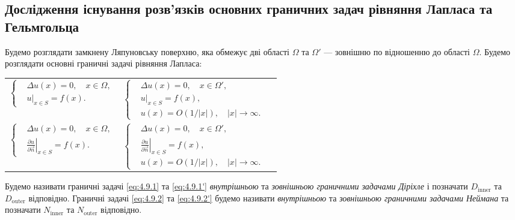\subsection{Дослідження існування розв'язків основних граничних задач рівняння Лапласа та Гельмгольца}

Будемо розглядати замкнену Ляпуновську поверхню, яка обмежує дві області $\Omega$ та $\Omega'$ --- зовнішню по відношенню до області $\Omega$. Будемо розглядати основні граничні задачі рівняння Лапласа:
\begin{longtable}{p{} p{} p{}}
	\parbox{.45\textwidth}{\begin{equation}\label{eq:4.9.1}\left\{\begin{aligned}
		& \Delta u(x) = 0, \quad x \in \Omega, \\
		& \left. u \right|_{x \in S} = f(x).
	\end{aligned}\right.\end{equation}} & \parbox{.45\textwidth}{\begin{equation}\label{eq:4.9.1'}\left\{\begin{aligned}
		& \Delta u(x) = 0, \quad x \in \Omega', \\
		& \left. u \right|_{x \in S} = f(x), \\
		& u(x) = O(1/|x|), \quad |x| \to \infty.
	\end{aligned}\right.\end{equation}} \\
	\parbox{.45\textwidth}{\begin{equation}\label{eq:4.9.2}\left\{\begin{aligned}
		& \Delta u(x) = 0, \quad x \in \Omega, \\
		& \left. \frac{\partial u}{\partial \vec n} \right|_{x \in S} = f(x).
	\end{aligned}\right.\end{equation}} & \parbox{.45\textwidth}{\begin{equation}\label{eq:4.9.2'}\left\{\begin{aligned}
		& \Delta u(x) = 0, \quad x \in \Omega', \\
		& \left. \frac{\partial u}{\partial \vec n} \right|_{x \in S} = f(x), \\
		& u(x) = O(1/|x|), \quad |x| \to \infty.
	\end{aligned}\right.\end{equation}}
\end{longtable}

\begin{definition}
	Будемо називати граничні задачі \eqref{eq:4.9.1} та \eqref{eq:4.9.1'} \textit{внутрішньою} та \textit{зовнішньою граничними задачами Діріхле} і позначати $D_{\text{inner}}$ та $D_{\text{outer}}$ відповідно. Граничні задачі \eqref{eq:4.9.2} та \eqref{eq:4.9.2'} будемо називати \textit{внутрішньою} та \textit{зовнішньою граничними задачами Неймана} та позначати $N_{\text{inner}}$ та $N_{\text{outer}}$ відповідно.  	
\end{definition}

